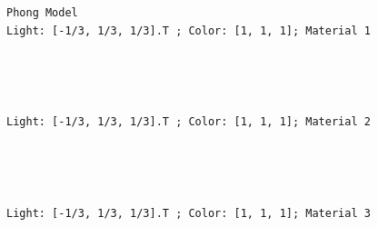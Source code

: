 \documentclass[11pt]{article}
\begin{document}
    \begin{Verbatim}[commandchars=\\\{\}]
Phong Model
Light: [-1/3, 1/3, 1/3].T ; Color: [1, 1, 1]; Material 1

    \end{Verbatim}

    \begin{center}
    \end{center}
    { \hspace*{\fill} \\}
    
    \begin{center}
    \end{center}
    { \hspace*{\fill} \\}
    
    \begin{Verbatim}[commandchars=\\\{\}]
Light: [-1/3, 1/3, 1/3].T ; Color: [1, 1, 1]; Material 2

    \end{Verbatim}

    \begin{center}
    \end{center}
    { \hspace*{\fill} \\}
    
    \begin{center}
    \end{center}
    { \hspace*{\fill} \\}
    
    \begin{Verbatim}[commandchars=\\\{\}]
Light: [-1/3, 1/3, 1/3].T ; Color: [1, 1, 1]; Material 3

    \end{Verbatim}

    \begin{center}
    \end{center}
    { \hspace*{\fill} \\}
    
\end{document}
